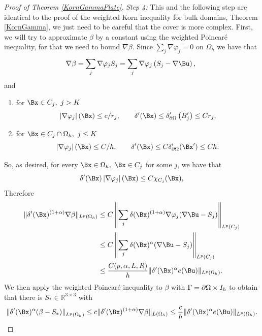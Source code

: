 \begin{proof}[Proof of Theorem \ref{KornGammaPlate}]
\textit{Step 4:} This and the following step are identical to the proof of the weighted Korn inequality for bulk domains, Theorem \ref{KornGamma}, we just need to be careful that the cover is more complex. First, we will try to approximate $\beta$ by a constant using the weighted Poincaré inequality, for that we need to bound $\nabla \beta$. 
Since $\sum_j \nabla \varphi_j=0$ on $\Omega_h$ we have that
$$
\nabla \beta=\sum_j \nabla \varphi_j S_j=\sum_j \nabla \varphi_j\left(S_j-\nabla \Bu\right) \text {, }
$$
and
\begin{enumerate}
    \item for $\Bx\in C_j,\ j> K$
    $$\left|\nabla \varphi_{j}\right|(\Bx) \leq c / r_j,\qquad  \delta'(\Bx)\leq\delta'_{\dOm}\left(B'_{j}\right) \leq C r_j,$$
    \item for $\Bx\in C_j\cap\Omega_h,\ j\leq K$
    $$ \left|\nabla \varphi_{j}\right|(\Bx) \leq C / h,\qquad  \delta'(\Bx)\leq C \delta'_{\dOm}(\Bx') \leq C h.$$
\end{enumerate}
So, as desired, for every $\Bx \in \Omega_h,\ \Bx\in C_j$ for some $j$, we have that
$$
\delta'(\Bx)\left|\nabla \varphi_j\right|(\Bx) \leq C \chi_{C_{j}}(\Bx),
$$
Therefore
\begin{align*}
 \|\delta'(\Bx)^{(1+\alpha)}\nabla \beta\|_{L^p(\Omega_h)} & \leq C \left\|\sum_j\delta(\Bx)^{(1+\alpha)}\nabla \varphi_j(\nabla \Bu-S_j)\right\|_{L^p(C_j)} \\
    & \leq C  \left\|\sum_j\delta(\Bx)^\alpha (\nabla \Bu-S_j)\right\|_{L^p(C_j)}\\
    & \leq  \frac{C(p,\alpha,L,R)}{h} \|\delta'(\Bx)^\alpha e(\Bu)\|_{L^p(\Omega_h)}.
\end{align*}
We then apply the weighted Poincaré  inequality to $\beta$ with $\Gamma=\partial\Omega\times I_h$ to obtain that there is $S_* \in \mathbb{R}^{3 \times 3}$ with
$$
\left\|\delta'(\Bx)^{\alpha }(\beta-S_*)\right\|_{L^p(\Omega_h)} \leq c \|\delta'(\Bx)^{(1+\alpha)}\nabla \beta\|_{L(\Omega_h)}  \leq  \frac{c}{h} \|\delta'(\Bx)^\alpha e(\Bu)\|_{L^p(\Omega_h)} .
$$


\end{proof}
